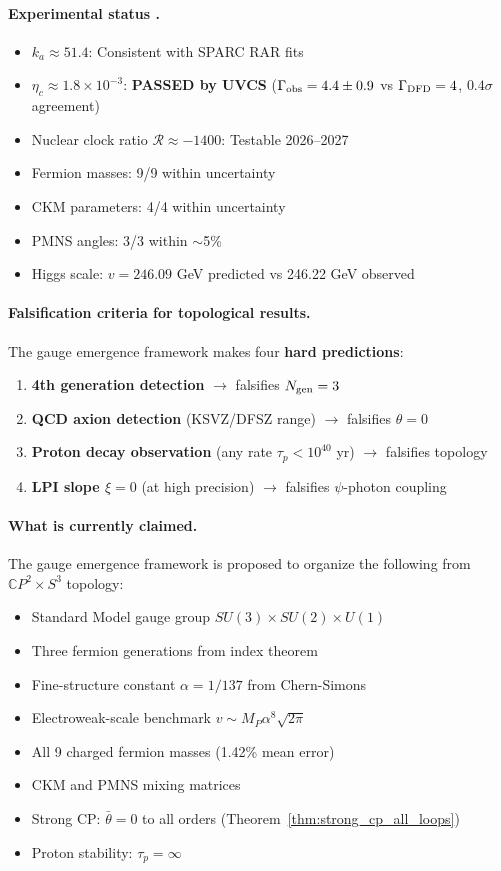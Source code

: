 \paragraph{Experimental status .}
\begin{itemize}
\item $k_a \approx 51.4$: Consistent with SPARC RAR fits
\item $\eta_c \approx 1.8 \times 10^{-3}$: \textbf{PASSED by UVCS} ($\Gamma_{\rm obs} = 4.4 \pm 0.9$ vs $\Gamma_{\rm DFD} = 4$, $0.4\sigma$ agreement)
\item Nuclear clock ratio $\mathcal{R} \approx -1400$: Testable 2026--2027
\item Fermion masses: 9/9 within uncertainty
\item CKM parameters: 4/4 within uncertainty
\item PMNS angles: 3/3 within $\sim$5\%
\item Higgs scale: $v = 246.09$ GeV predicted vs 246.22 GeV observed
\end{itemize}

\paragraph{Falsification criteria for topological results.}
The gauge emergence framework makes four \textbf{hard predictions}:
\begin{enumerate}
\item \textbf{4th generation detection} $\to$ falsifies $N_{\rm gen} = 3$
\item \textbf{QCD axion detection} (KSVZ/DFSZ range) $\to$ falsifies $\theta = 0$
\item \textbf{Proton decay observation} (any rate $\tau_p < 10^{40}$ yr) $\to$ falsifies topology
\item \textbf{LPI slope $\xi = 0$} (at high precision) $\to$ falsifies $\psi$-photon coupling
\end{enumerate}

\paragraph{What is currently claimed.}
The gauge emergence framework is proposed to organize the following from $\mathbb{C}P^2 \times S^3$ topology:
\begin{itemize}
\item Standard Model gauge group $SU(3) \times SU(2) \times U(1)$
\item Three fermion generations from index theorem
\item Fine-structure constant $\alpha = 1/137$ from Chern-Simons
\item Electroweak-scale benchmark $v \sim M_P \alpha^8 \sqrt{2\pi}$
\item All 9 charged fermion masses (1.42\% mean error)
\item CKM and PMNS mixing matrices
\item Strong CP: $\bar{\theta} = 0$ to all orders (Theorem~\ref{thm:strong_cp_all_loops})
\item Proton stability: $\tau_p = \infty$
\end{itemize}

